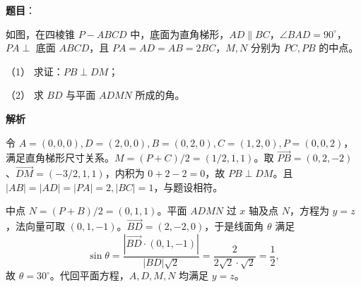 \begin{answer}

\textbf{题目}：

如图，在四棱锥 $P-ABCD$ 中，底面为直角梯形，$AD\parallel BC$，$\angle BAD=90^\circ$，$PA\perp$ 底面 $ABCD$，且 $PA=AD=AB=2BC$，$M,N$ 分别为 $PC,PB$ 的中点。

（1） 求证：$PB\perp DM$；

（2） 求 $BD$ 与平面 $ADMN$ 所成的角。
\nopagebreak[4]
\begin{center}\end{center}
\nopagebreak[4]
\textbf{解析}


令 $A=(0,0,0),D=(2,0,0),B=(0,2,0),C=(1,2,0),P=(0,0,2)$，满足直角梯形尺寸关系。$M=(P+C)/2=(1/2,1,1)$。取 $\overrightarrow{PB}=(0,2,-2)$、$\overrightarrow{DM}=(-3/2,1,1)$，内积为 $0+2-2=0$，故 $PB\perp DM$。且 $|AB|=|AD|=|PA|=2, |BC|=1$，与题设相符。


中点 $N=(P+B)/2=(0,1,1)$。平面 $ADMN$ 过 $x$ 轴及点 $N$，方程为 $y=z$，法向量可取 $(0,1,-1)$。$\overrightarrow{BD}=(2,-2,0)$，于是线面角 $\theta$ 满足
\nopagebreak[4]
\[
\sin\theta=\frac{|\overrightarrow{BD}\cdot(0,1,-1)|}{|BD|\sqrt2}=\frac{2}{2\sqrt2\cdot\sqrt2}=\frac12,
\]
故 $\theta=30^\circ$。代回平面方程，$A,D,M,N$ 均满足 $y=z$。



\end{answer}

